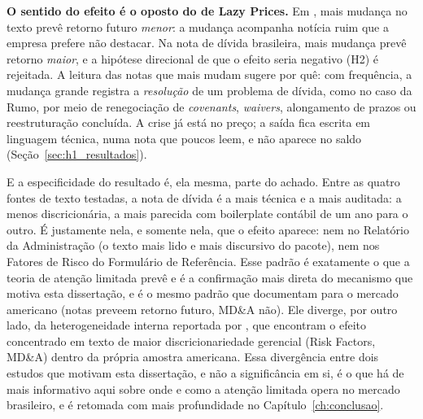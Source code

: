\documentclass[a4paper,12pt]{report}
\begin{document}
\textbf{O sentido do efeito é o oposto do de Lazy Prices.} Em , mais mudança no texto prevê retorno futuro \emph{menor}: a mudança acompanha notícia ruim que a empresa prefere não destacar. Na nota de dívida brasileira, mais mudança prevê retorno \emph{maior}, e a hipótese direcional de que o efeito seria negativo (H2) é rejeitada. A leitura das notas que mais mudam sugere por quê: com frequência, a mudança grande registra a \emph{resolução} de um problema de dívida, como no caso da Rumo, por meio de renegociação de \textit{covenants}, \textit{waivers}, alongamento de prazos ou reestruturação concluída. A crise já está no preço; a saída fica escrita em linguagem técnica, numa nota que poucos leem, e não aparece no saldo (Seção~\ref{sec:h1_resultados}).

E a especificidade do resultado é, ela mesma, parte do achado. Entre as quatro fontes de texto testadas, a nota de dívida é a mais técnica e a mais auditada: a menos discricionária, a mais parecida com boilerplate contábil de um ano para o outro. É justamente nela, e somente nela, que o efeito aparece: nem no Relatório da Administração (o texto mais lido e mais discursivo do pacote), nem nos Fatores de Risco do Formulário de Referência. Esse padrão é exatamente o que a teoria de atenção limitada prevê e é a confirmação mais direta do mecanismo que motiva esta dissertação, e é o mesmo padrão que  documentam para o mercado americano (notas preveem retorno futuro, MD\&A não). Ele diverge, por outro lado, da heterogeneidade interna reportada por , que encontram o efeito concentrado em texto de maior discricionariedade gerencial (Risk Factors, MD\&A) dentro da própria amostra americana. Essa divergência entre dois estudos que motivam esta dissertação, e não a significância em si, é o que há de mais informativo aqui sobre onde e como a atenção limitada opera no mercado brasileiro, e é retomada com mais profundidade no Capítulo~\ref{ch:conclusao}.
\end{document}
